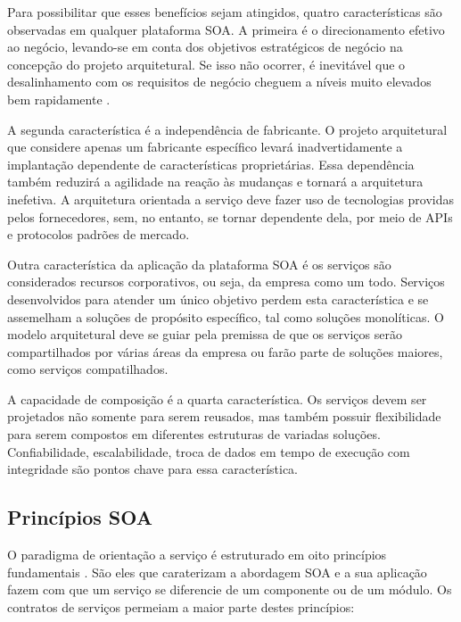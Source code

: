 Para possibilitar que esses benefícios sejam atingidos, quatro características
são observadas em qualquer plataforma SOA. A primeira é o direcionamento
efetivo ao negócio, levando-se em conta dos objetivos estratégicos de negócio na
concepção do projeto arquitetural. Se isso não ocorrer, é inevitável que o
desalinhamento com os requisitos de negócio cheguem a níveis muito elevados
bem rapidamente \cite{erl2008soaDesigPatterns}.

A segunda característica é a independência de fabricante. O projeto arquitetural
que considere apenas um fabricante específico levará inadvertidamente a
implantação dependente de características proprietárias. Essa dependência também
reduzirá a agilidade na reação às mudanças e tornará a arquitetura inefetiva. A
arquitetura orientada a serviço deve fazer uso de tecnologias providas pelos
fornecedores, sem, no entanto, se tornar dependente dela, por meio de APIs e
protocolos padrões de mercado.

Outra característica da aplicação da plataforma SOA é os serviços são
considerados recursos corporativos, ou seja, da empresa como um todo. Serviços
desenvolvidos para atender um único objetivo perdem esta característica e se
assemelham a soluções de propósito específico, tal como soluções monolíticas. O
modelo arquitetural deve se guiar pela premissa de que os serviços serão
compartilhados por várias áreas da empresa ou farão parte de soluções maiores,
como serviços compatilhados.

A capacidade de composição é a quarta característica. Os serviços devem ser
projetados não somente para serem reusados, mas também possuir
flexibilidade para serem compostos em diferentes estruturas de variadas
soluções. Confiabilidade, escalabilidade, troca de dados em tempo de execução
com integridade são pontos chave para essa característica.



\subsection{Princípios SOA}
\label{PrincipiosSOA} 
\vspace{-6mm}

O paradigma de orientação a serviço é estruturado em oito princípios
fundamentais \cite{erl2009web}. São eles que caraterizam a abordagem SOA e a sua
aplicação fazem com que um serviço se diferencie de um componente ou de
um módulo.
Os contratos de serviços permeiam a maior parte destes princípios:

